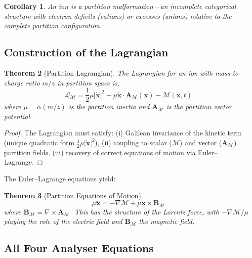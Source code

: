 \documentclass[11pt,twocolumn,a4paper]{article}
\newtheorem{theorem}{Theorem}[section]
\newtheorem{corollary}[theorem]{Corollary}
\theoremstyle{definition}
\theoremstyle{remark}
\newcommand{\Depth}{\mathcal{M}}
\newcommand{\partinert}{\mu}
\newcommand{\Apartition}{\mathbf{A}_{\mathcal{M}}}
\newcommand{\Lagr}{\mathcal{L}}
\begin{document}
\begin{corollary}
An ion is a \emph{partition malformation}---an incomplete categorical structure with electron deficits (cations) or excesses (anions) relative to the complete partition configuration.
\end{corollary}

\subsection{Construction of the Lagrangian}

\begin{theorem}[Partition Lagrangian]
\label{thm:lagrangian}
The Lagrangian for an ion with mass-to-charge ratio $m/z$ in partition space is:
\begin{equation}
\boxed{\Lagr_\Depth = \frac{1}{2}\partinert|\dot{\mathbf{x}}|^2 + \partinert\dot{\mathbf{x}}\cdot\Apartition(\mathbf{x}) - \Depth(\mathbf{x}, t)}
\label{eq:lagrangian}
\end{equation}
where $\partinert = \alpha(m/z)$ is the partition inertia and $\Apartition$ is the partition vector potential.
\end{theorem}

\begin{proof}
The Lagrangian must satisfy: (i) Galilean invariance of the kinetic term (unique quadratic form $\frac{1}{2}\partinert|\dot{\mathbf{x}}|^2$), (ii) coupling to scalar ($\Depth$) and vector ($\Apartition$) partition fields, (iii) recovery of correct equations of motion via Euler--Lagrange.
\end{proof}

The Euler--Lagrange equations yield:

\begin{theorem}[Partition Equations of Motion]
\label{thm:eom}
\begin{equation}
\partinert\ddot{\mathbf{x}} = -\nabla\Depth + \partinert\dot{\mathbf{x}} \times \mathbf{B}_\Depth
\end{equation}
where $\mathbf{B}_\Depth = \nabla \times \Apartition$. This has the structure of the Lorentz force, with $-\nabla\Depth/\partinert$ playing the role of the electric field and $\mathbf{B}_\Depth$ the magnetic field.
\end{theorem}

\subsection{All Four Analyser Equations}
\end{document}
